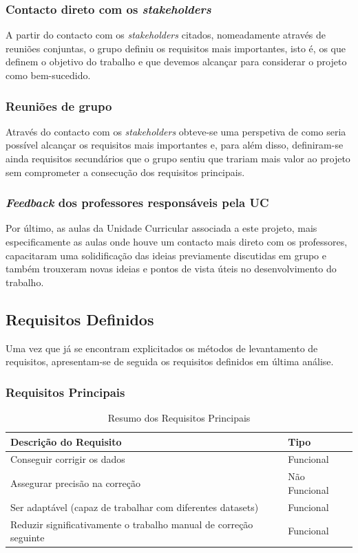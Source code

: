 \documentclass[a4paper,12pt]{article}
\begin{document}
\subsubsection{Contacto direto com os \textit{stakeholders}}
A partir do contacto com os \textit{stakeholders} citados, nomeadamente através de reuniões conjuntas, o grupo definiu os requisitos mais importantes, isto é, os que definem o objetivo do trabalho e que devemos alcançar para considerar o projeto como bem-sucedido.

\subsubsection{Reuniões de grupo}
Através do contacto com os \textit{stakeholders} obteve-se uma perspetiva de como seria possível alcançar os requisitos mais importantes e, para além disso, definiram-se ainda requisitos secundários que o grupo sentiu que trariam mais valor ao projeto sem comprometer a consecução dos requisitos principais.

\subsubsection{\textit{Feedback} dos professores responsáveis pela UC}
Por último, as aulas da Unidade Curricular associada a este projeto, mais especificamente as aulas onde houve um contacto mais direto com os professores, capacitaram uma solidificação das ideias previamente discutidas em grupo e também trouxeram novas ideias e pontos de vista úteis no desenvolvimento do trabalho.

\subsection{Requisitos Definidos}
Uma vez que já se encontram explicitados os métodos de levantamento de requisitos, apresentam-se de seguida os requisitos definidos em última análise.\\

\subsubsection{Requisitos Principais}
\begin{table}[h!]
    \centering
    \begin{tabularx}{\textwidth}{|X|l|}
        \hline
        \textbf{Descrição do Requisito} & \textbf{Tipo} \\ \hline
        Conseguir corrigir os dados & Funcional \\ \hline
        Assegurar precisão na correção & Não Funcional \\ \hline
        Ser adaptável (capaz de trabalhar com diferentes datasets) & Funcional \\ \hline
        Reduzir significativamente o trabalho manual de correção seguinte & Funcional \\ \hline
    \end{tabularx}
    \caption{Resumo dos Requisitos Principais}
    \label{tab:requirements}
\end{table}
\end{document}
